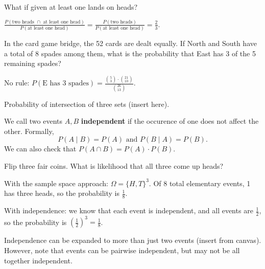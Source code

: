 \begin{eg}
	What if given at least one lands on heads?
\end{eg}
\begin{explanation}
	\( \frac{P(\text{two heads } \cap \text{ at least one head})}{P(\text{at least one head})} = \frac{P(\text{two heads})}{P(\text{at least one head})} = \frac{2}{3}\). 
\end{explanation}

\begin{eg}
	In the card game bridge, the 52 cards are dealt equally. If North and South have a total of 8 spades among them, what is the probability that East has 3 of the 5 remaining spades?
\end{eg}
\begin{explanation}
	No rule: \( P(\text{E has 3 spades}) = \frac{\binom{5}{3} \cdot \binom{21}{10}}{\binom{26}{13}} \).
\end{explanation}

\begin{theorem}
	Probability of intersection of three sets (insert here).
\end{theorem}

\begin{definition}
	We call two events \( A,B \) \textbf{independent} if the occurence of one does not affect the other. Formally, \[
		P(A \mid B) = P(A) \text{ and } P(B \mid A) = P(B)
	.\] We can also check that \( P(A \cap B) = P(A)\cdot P(B) \).
\end{definition}

\begin{eg}
	Flip three fair coins. What is likelihood that all three come up heads?
\end{eg}
\begin{explanation}
	With the sample space approach: \( \Omega =\{H,T\}^3  \). Of 8 total elementary events, 1 has three heads, so the probability is \( \frac{1}{8} \).

	With independence: we know that each event is independent, and all events are \( \frac{1}{2} \), so the probability is \( \left( \frac{1}{2} \right) ^3 =\frac{1}{8}\).
\end{explanation}

\begin{definition}
	Independence can be expanded to more than just two events (insert from canvas). However, note that events can be pairwise independent, but may not be all together independent.
\end{definition}


